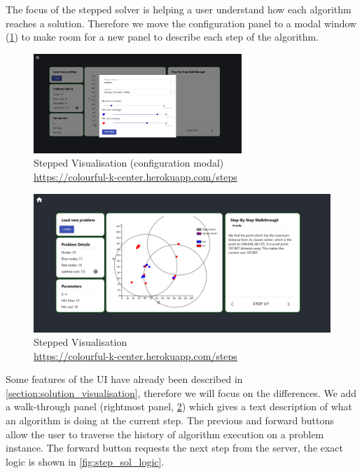 The focus of the stepped solver is helping a user understand how each algorithm reaches a solution. Therefore we move the configuration panel to a modal window (\cref{fig:step_sol_modal}) to make room for a new panel to describe each step of the algorithm.

\begin{figure}[H]
    \centering
    \includegraphics[width=0.7\textwidth]{images/stepped_solver_ui/stepped_solver_modal.png}
    \caption{Stepped Visualisation (configuration modal)\\\url{https://colourful-k-center.herokuapp.com/steps}}
    \label{fig:step_sol_modal}
\end{figure}

\begin{figure}[H]
    \centering
    \includegraphics[width=\textwidth]{images/stepped_solver_ui/stepped_solver_greedy.png}
    \caption{Stepped Visualisation\\\url{https://colourful-k-center.herokuapp.com/steps}}
    \label{fig:step_sol_greedy}
\end{figure}

Some features of the UI have already been described in \cref{section:solution_visualisation}, therefore we will focus on the differences. We add a walk-through panel (rightmost panel, \cref{fig:step_sol_greedy}) which gives a text description of what an algorithm is doing at the current step. The previous and forward buttons allow the user to traverse the history of algorithm execution on a problem instance. The forward button requests the next step from the server, the exact logic is shown in \cref{fig:step_sol_logic}.

